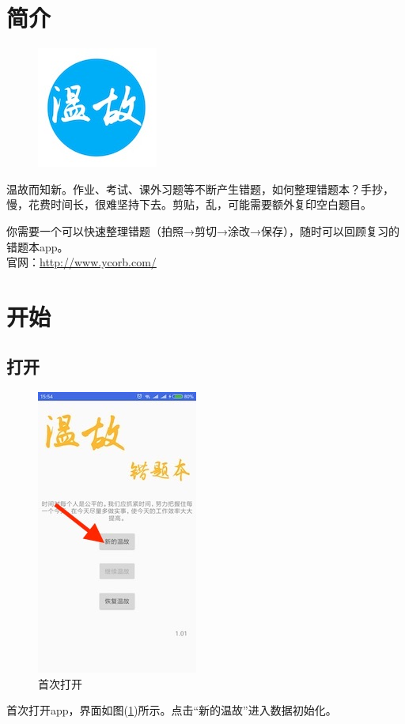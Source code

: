 \section{简介}

\begin{figure}[H]
\centering
\includegraphics{img/logo.jpg}
\end{figure}
温故而知新。作业、考试、课外习题等不断产生错题，如何整理错题本？手抄，慢，花费时间长，很难坚持下去。剪贴，乱，可能需要额外复印空白题目。

你需要一个可以快速整理错题（拍照→剪切→涂改→保存），随时可以回顾复习的错题本app。\\

官网：\url{http://www.ycorb.com/}


\section{开始}
\subsection{打开}
\begin{figure}[H]
	\centering
	\includegraphics{img/1.jpg}
	\caption{首次打开}
	\label{img1}
\end{figure}
首次打开app，界面如图(\ref{img1})所示。点击“新的温故”进入数据初始化。

